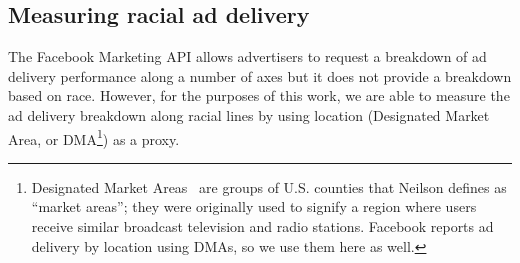 \subsection{Measuring racial ad delivery}\label{subsec:race-audiences}
The Facebook Marketing API allows advertisers to request a breakdown of ad delivery performance along a number of axes but it does not provide a breakdown based on race.
%
However, for the purposes of this work, we are able to measure the ad delivery breakdown along racial lines by using location (Designated Market Area, or DMA\footnote{Designated Market Areas~\cite{NeilsonDMARegions} are groups of U.S. counties that Neilson defines as ``market areas''; they were originally used to signify a region where users receive similar broadcast television and radio stations.  Facebook reports ad delivery by location using DMAs, so we use them here as well.}) as a proxy.


